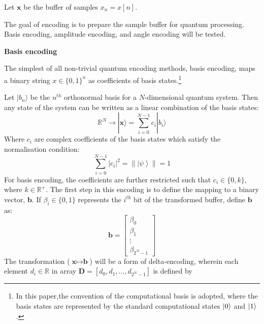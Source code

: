 Let $\mathbf{x}$ be the buffer of samples $x_n=x[n]$.

The goal of encoding is to prepare the sample buffer for quantum processing.
Basis encoding, amplitude encoding, and angle encoding will be tested.

\textbf{Basis encoding}

The simplest of all non-trivial quantum encoding methods, basis encoding, maps a binary string $x \in {\{0,1\}}^n$ as coefficients of basis states.\footnote{In this paper,the convention of the computational basis is adopted, where the basis states are represented by the standard computational states $\left\vert{0}\right\rangle$ and $\left\vert{1}\right\rangle$.}

Let $\vert b_n \rangle$ be the $n^{th}$ orthonormal basis for a $N$-dimensional quantum system.
Then any state of the system can be written as a linear combination of the basis states:
\begin{equation}
    \displaystyle{
        \mathbb{R}^N \rightarrow | \mathbf{x} \rangle =
        \sum_{i=0}^{N-1}
            c_i | b_i \rangle
    }
\end{equation}
Where $c_i$ are complex coefficients of the basis states which satisfy the normalisation condition:
\begin{equation}
\label{eqn:normalisation_constraint}
    \displaystyle{\sum_{i=0}^{N-1} |c_i|^2 = \left\| \left|\psi\right\rangle \right\| = 1}
\end{equation}
% 
For basis encoding, the coefficients are further restricted such that $c_i \in \{0, k\}$, where $k \in \mathbb{R}^+$.
% 
The first step in this encoding is to define the mapping to a binary vector, $\textbf{b}$. If $\beta_i \in \{0, 1\}$ represents the $i^{th}$ bit of the transformed buffer, define $\textbf{b}$ as:
\begin{equation}
    \displaystyle{\mathbf{b} = \begin{bmatrix} \beta_0 \\ \beta_1 \\ \vdots \\ \beta_{2^{N}-1} \end{bmatrix}}
\end{equation}
% 
% 
The transformation ($\textbf{x} \mapsto \textbf{b}$) will be a form of delta-encoding, wherein each element $d_i \in \mathbb{R}$ in array $\mathbf{D} = [d_0, d_1, \ldots, d_{2^N-1}]$ is defined by

